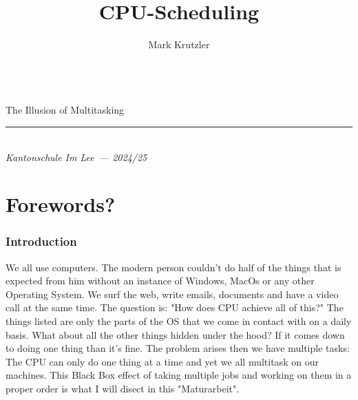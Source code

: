 \documentclass{report}
\title{CPU-Scheduling}
\author{Mark Krutzler}
\newcommand{\thesubtitle}{The Illusion of Multitasking}
\newcommand{\currentdate}{2024/25}
\newcommand{\auinstitution}{Kantonschule Im Lee}
\renewcommand{\maketitle}{
\begin{center}


{\Huge\bfseries
\thetitle}
\vspace{0.5em}\\
{\LARGE\thesubtitle}


{\rule{0.4\textwidth}{.4pt}}

{\bfseries \theauthor}\\
\textit{\auinstitution \ --- \currentdate}
\end{center}
}
\begin{document}
\begin{titlepage}
\vspace*{\fill}
\centering
\maketitle
\vspace*{\fill}
\end{titlepage}

\tableofcontents



\part{Forewords?}

\section{Introduction}


We all use computers.
The modern person couldn't do half of the things that is expected from him without an instance of Windows, MacOs or any other Operating System.
We surf the web, write emails, documents and have a video call at the same time.
The question is: "How does CPU achieve all of this?" The things listed are only the parts of the OS that we come in contact with on a daily basis.
What about all the other things hidden under the hood? If it comes down to doing one thing than it's fine.
The problem arises then we have multiple tasks: The CPU can only do one thing at a time and yet we all multitask on our machines.
This Black Box effect of taking multiple jobs and working on them in a proper order is what I will disect in this "Maturarbeit".
\end{document}
